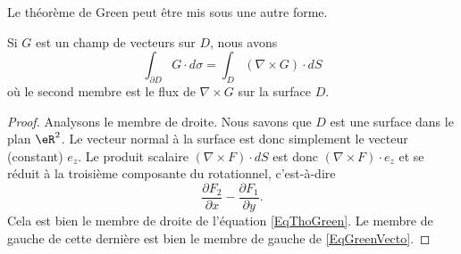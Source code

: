 Le théorème de Green peut être mis sous une autre forme.

\begin{theorem}       \label{ThoGreenVecto}
	Si $G$ est un champ de vecteurs sur $D$, nous avons
	\begin{equation}        \label{EqGreenVecto}
		\int_{\partial D}G\cdot d\sigma=\int_D(\nabla\times G)\cdot dS
	\end{equation}
	où le second membre est le flux de $\nabla\times G$ sur la surface $D$.
\end{theorem}

\begin{proof}
	Analysons le membre de droite. Nous savons que $D$ est une surface dans le plan $\eR^2$. Le vecteur normal à la surface est donc simplement le vecteur (constant) $e_z$. Le produit scalaire $(\nabla\times F)\cdot dS$ est donc $(\nabla\times F)\cdot e_z$ et se réduit à la troisième composante du rotationnel, c'est-à-dire
	\begin{equation}
		\frac{ \partial F_2 }{ \partial x }-\frac{ \partial F_1 }{ \partial y }.
	\end{equation}
	Cela est bien le membre de droite de l'équation \eqref{EqThoGreen}. Le membre de gauche de cette dernière est bien le membre de gauche de \eqref{EqGreenVecto}.
\end{proof}

